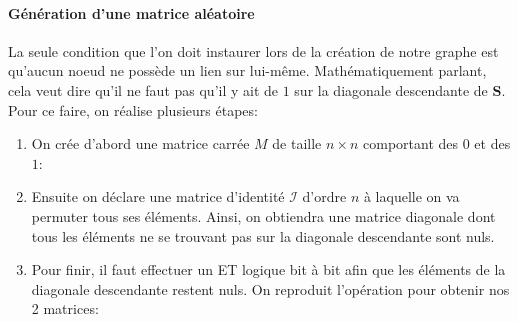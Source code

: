 \documentclass[12pt,twoside, openright]{memoir}
\newcommand{\courrier}[1]{{\fontfamily{qcr}\selectfont {#1}}}
\begin{document}
	\paragraph*{Génération d'une matrice aléatoire} La seule condition que l'on doit instaurer lors de la création de notre graphe est qu'aucun noeud ne possède un lien sur lui-même. Mathématiquement parlant, cela veut dire qu'il ne faut pas qu'il y ait de $1$ sur la diagonale descendante de $\textbf{S}$.\\
	Pour ce faire, on réalise plusieurs étapes:
	\begin{enumerate}
		\item On crée d'abord une matrice carrée $M$ de taille $n\times n$ comportant des $0$ et des $1$: \begin{center}\courrier{a = np.random.randint(2, size=(n, n))}\end{center}
		\item Ensuite on déclare une matrice d'identité $\mathcal{I}$ d'ordre $n$ à laquelle on va permuter tous ses éléments. Ainsi, on obtiendra une matrice diagonale dont tous les éléments ne se trouvant pas sur la diagonale descendante sont nuls.
		\begin{center}\courrier{inverse = 1-np.eye(n, dtype=np.int)}\end{center}
		\item Pour finir, il faut effectuer un ET logique bit à bit afin que les éléments de la diagonale descendante restent nuls. On reproduit l'opération pour obtenir nos 2 matrices:
		\begin{center}
			\courrier{p_mat = np.bitwise_and(a, inverse)}\\
			\courrier{c_mat = np.bitwise_and(np.transpose(a), inverse)}
		\end{center}
	\end{enumerate}
\end{document}
